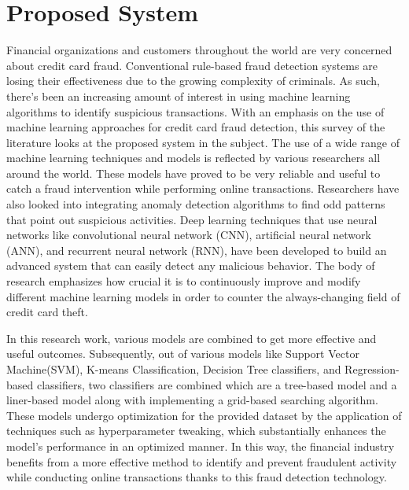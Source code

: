 \section{Proposed System}

Financial organizations and customers throughout the world are very concerned about credit card fraud. Conventional rule-based fraud detection systems are losing their effectiveness due
to the growing complexity of criminals. As such, there's been an increasing amount of interest in
using machine learning algorithms to identify suspicious transactions. With an emphasis on the
use of machine learning approaches for credit card fraud detection, this survey of the literature
looks at the proposed system in the subject. The use of a wide range of machine learning
techniques and models is reflected by various researchers all around the world. These models
have proved to be very reliable and useful to catch a fraud intervention while performing online transactions. Researchers have also looked into integrating anomaly detection algorithms to find
odd patterns that point out suspicious activities. Deep learning techniques that use neural
networks like convolutional neural network (CNN), artificial neural network (ANN), and recurrent
neural network (RNN), have been developed to build an advanced system that can easily detect
any malicious behavior. The body of research emphasizes how crucial it is to continuously
improve and modify different machine learning models in order to counter the always-changing
field of credit card theft.


In this research work, various models are combined to get more effective and useful outcomes.
Subsequently, out of various models like Support Vector Machine(SVM), K-means
Classification, Decision Tree classifiers, and Regression-based classifiers, two classifiers are
combined which are a tree-based model and a liner-based model along with implementing a
grid-based searching algorithm. These models undergo optimization for the provided dataset by
the application of techniques such as hyperparameter tweaking, which substantially enhances
the model's performance in an optimized manner. In this way, the financial industry benefits
from a more effective method to identify and prevent fraudulent activity while conducting online
transactions thanks to this fraud detection technology.



